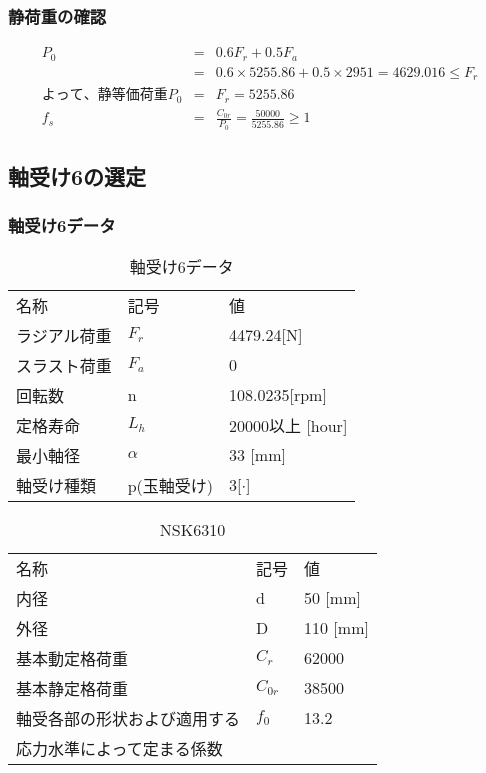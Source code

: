 \subsubsection{静荷重の確認}
\begin{eqnarray}
P_0&=&0.6F_r+0.5F_a\\
&=&0.6 \times 5255.86 + 0.5 \times 2951 = 4629.016 \leq F_r\\
よって、静等価荷重P_0 &=& F_r = 5255.86\\
f_s &=& \frac{C_{0r}}{P_0} = \frac{50000}{5255.86}\geq 1
\end{eqnarray}


\newpage
\subsection{軸受け6の選定}

\subsubsection{軸受け6データ}
\begin{table}[htb]
\begin{center}
  \caption{軸受け6データ}
  \begin{tabular}{lll} \hline
名称&記号&値\\
ラジアル荷重&$F_r$&4479.24[N]\\
スラスト荷重&$F_a$&0\\
回転数&n&108.0235[rpm]\\
定格寿命&$L_h$&20000以上 [hour]\\
最小軸径&$\alpha$&33 [mm]\\
軸受け種類&p(玉軸受け)&3[$\cdot$]\\
\hline
  \end{tabular}
\end{center}
\end{table}

\begin{table}[htb]
\begin{center}
  \caption{NSK6310}
  \begin{tabular}{lll} \hline
名称&記号&値\\
内径& d &50 [mm]\\
外径& D &110 [mm]\\
基本動定格荷重&$C_{r}$&62000\\
基本静定格荷重&$C_{0r}$&38500\\
軸受各部の形状および適用する&$f_0$&13.2\\
応力水準によって定まる係数&&\\
\hline
  \end{tabular}
\end{center}
\end{table}


